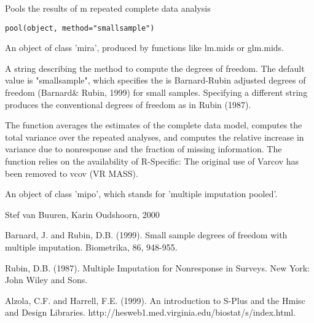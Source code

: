 \documentclass{article}
\begin{document}
\begin{Description}\relax
Pools the results of m repeated complete data analysis
\end{Description}
\begin{Usage}
\begin{verbatim}
pool(object, method="smallsample")
\end{verbatim}
\end{Usage}
\begin{Arguments}
\begin{ldescription}
\item[\code{object}] An object of class 'mira', produced by functions like lm.mids or glm.mids.
\item[\code{method}] A string describing the method to compute the degrees of freedom. 
The default value is "smallsample", which specifies the is 
Barnard-Rubin adjusted degrees of freedom (Barnard\& Rubin, 1999) 
for small samples. Specifying a different string 
produces the conventional degrees of freedom as in Rubin (1987).
\end{ldescription}
\end{Arguments}
\begin{Details}\relax
The function averages the estimates of the complete data model, 
computes the total variance over the repeated analyses, and computes
the relative increase in variance due to nonresponse and the fraction 
of missing information. The function relies on the availability
of
R-Specific: The original use of Varcov has been removed to vcov (VR MASS).
\end{Details}
\begin{Value}
An object of class 'mipo', which stands for 'multiple imputation pooled'.
\end{Value}
\begin{Author}\relax
Stef van Buuren, Karin Oudshoorn, 2000
\end{Author}
\begin{References}\relax
Barnard, J. and Rubin, D.B. (1999). Small sample degrees of freedom with
multiple imputation. Biometrika, 86, 948-955.

Rubin, D.B. (1987). Multiple Imputation for Nonresponse in Surveys. 
New York: John Wiley and Sons.

Alzola, C.F. and Harrell, F.E. (1999). An introduction to S-Plus and the Hmisc 
and Design Libraries. http://hesweb1.med.virginia.edu/biostat/s/index.html.
\end{References}
\end{document}
